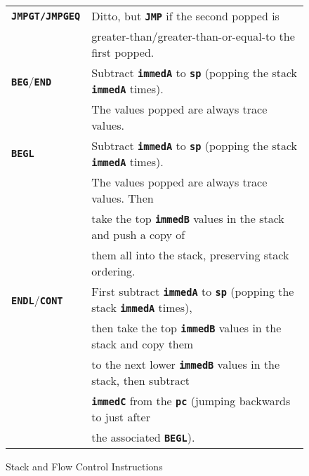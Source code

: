 \documentclass[12pt]{article}
\newcommand{\TT}[1]{{\tt \bfseries #1}}
\newlength{\figurewidth}
\newenvironment{boxedfigure}[1][!btp]%
	{\begin{figure*}[#1]
	 \begin{lrbox}{\figurebox}
	 \begin{minipage}{\figurewidth}

	 \vspace*{1ex}}%
	{
	 \vspace*{1ex}

	 \end{minipage}
	 \end{lrbox}

	 \centering
	 \fbox{\hspace*{0.1in}\usebox{\figurebox}\hspace*{0.1in}}
	 \end{figure*}}
\begin{document}
\begin{boxedfigure}
\begin{center}
\begin{tabular}{|l|l|}
\TT{JMPGT/JMPGEQ}
    & Ditto, but \TT{JMP} if the second popped is \\
    & greater-than/greater-than-or-equal-to the first popped.
\\\hline
\TT{BEG}/\TT{END}
    & Subtract \TT{immedA} to \TT{sp} (popping the stack \TT{immedA} times). \\
    & The values popped are always trace values.
\\\hline
\TT{BEGL}
    & Subtract \TT{immedA} to \TT{sp} (popping the stack \TT{immedA} times). \\
    & The values popped are always trace values.  Then \\
    & take the top \TT{immedB} values in the stack and push a copy of \\
    & them all into the stack, preserving stack ordering.
\\\hline
\TT{ENDL}/\TT{CONT}
    & First subtract \TT{immedA} to \TT{sp}
      (popping the stack \TT{immedA} times), \\
    & then take the top \TT{immedB} values in the stack and copy them \\
    & to the next lower \TT{immedB} values in the stack, then subtract \\
    & \TT{immedC} from the \TT{pc} (jumping backwards to just after \\
    & the associated \TT{BEGL}).
\\\hline
\end{tabular}
\end{center}
\vspace*{-3ex}
\caption{Stack and Flow Control Instructions}
\label{STACK-AND-FLOW-CONTROL-INSTRUCTIONS}
\end{boxedfigure}

\pagebreak
\end{document}
